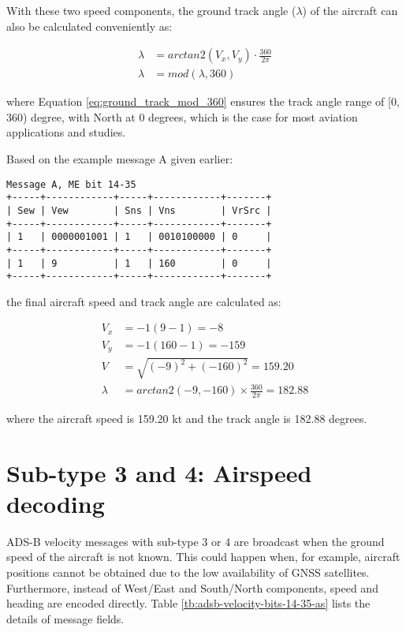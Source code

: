 With these two speed components, the ground track angle ($\lambda$) of the aircraft can also be calculated conveniently as:

\begin{align}
  \lambda &= arctan2 \left( V_x, V_y \right) \cdot \frac{360}{2\pi} \\
  \lambda &= mod(\lambda, 360) \label{eq:ground_track_mod_360}
\end{align}

where Equation \ref{eq:ground_track_mod_360} ensures the track angle range of [0, 360) degree, with North at 0 degrees, which is the case for most aviation applications and studies.

Based on the example message A given earlier:

\begin{verbatim}
Message A, ME bit 14-35
+-----+------------+-----+------------+-------+
| Sew | Vew        | Sns | Vns        | VrSrc |
+-----+------------+-----+------------+-------+
| 1   | 0000001001 | 1   | 0010100000 | 0     |
+-----+------------+-----+------------+-------+
| 1   | 9          | 1   | 160        | 0     |
+-----+------------+-----+------------+-------+
\end{verbatim}

the final aircraft speed and track angle are calculated as:

\begin{align}
  V_x &= -1 (9 - 1)  = -8 \\
  V_y &= -1 (160 - 1) = -159 \\
  V &= \sqrt{(-9)^2+ (-160)^2} = 159.20 \\
  \lambda &= arctan2(-9, -160) \times \frac{360}{2\pi} = 182.88
\end{align}

where the aircraft speed is 159.20 kt and the track angle is 182.88 degrees.


\section{Sub-type 3 and 4: Airspeed decoding}

ADS-B velocity messages with sub-type 3 or 4 are broadcast when the ground speed of the aircraft is not known. This could happen when, for example, aircraft positions cannot be obtained due to the low availability of GNSS satellites. Furthermore, instead of West/East and South/North components, speed and heading are encoded directly. Table \ref{tb:adsb-velocity-bits-14-35-as} lists the details of message fields.

